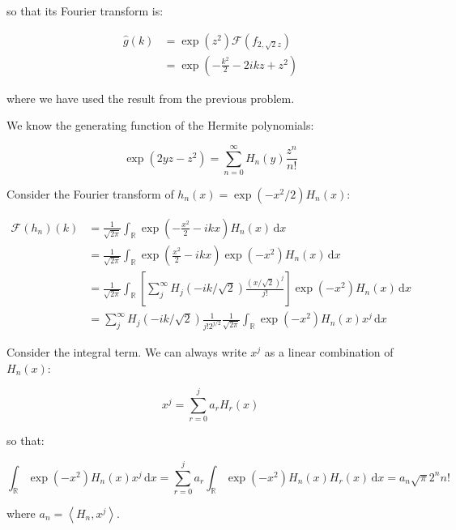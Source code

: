 \documentclass[12pt]{article}
\begin{document}
so that its Fourier transform is:

\begin{equation}
\begin{split}
    \hat{g}(k) &= \exp\left( z^{2} \right) \mathcal{F}(f_{2, \sqrt{2}z}) \\
    &= \exp\left( -\frac{k^{2}}{2} - 2ikz + z^{2} \right)
\end{split}
\end{equation}

where we have used the result from the previous problem.

We know the generating function of the Hermite polynomials:

\begin{equation}
    \exp(2yz - z^{2}) = \sum_{n = 0}^{\infty} H_{n}(y) \frac{z^{n}}{n!}
\end{equation}

Consider the Fourier transform of $h_{n}(x) = \exp(-x^{2}/2) H_{n}(x)$:

\begin{equation}
\begin{split}
    \mathcal{F}(h_{n})(k) &= \frac{1}{\sqrt{2\pi}} \int_{\mathbb{R}} \exp\left( -\frac{x^{2}}{2} -ikx \right) H_{n}(x) \, \mathrm{d}x \\
    &= \frac{1}{\sqrt{2\pi}} \int_{\mathbb{R}} \exp\left( \frac{x^{2}}{2} -ikx \right) \exp(-x^{2}) H_{n}(x) \, \mathrm{d}x \\
    &= \frac{1}{\sqrt{2\pi}} \int_{\mathbb{R}} \left[ \sum_{j}^{\infty} H_{j}(-ik/\sqrt{2}) \frac{(x/\sqrt{2})^{j}}{j!} \right] \exp(-x^{2}) H_{n}(x) \, \mathrm{d}x \\
    &= \sum_{j}^{\infty} H_{j}(-ik/\sqrt{2}) \frac{1}{j! 2^{j/2}} \frac{1}{\sqrt{2\pi}} \int_{\mathbb{R}} \exp(-x^{2}) H_{n}(x) x^{j} \, \mathrm{d}x
\end{split}
\end{equation}

Consider the integral term. We can always write $x^{j}$ as a linear combination of $H_{n}(x)$:

\begin{equation}
    x^{j} = \sum_{r = 0}^{j} a_{r} H_{r}(x)
\end{equation}

so that:

\begin{equation}
    \int_{\mathbb{R}} \exp(-x^{2}) H_{n}(x) x^{j} \, \mathrm{d}x = \sum_{r = 0}^{j} a_{r} \int_{\mathbb{R}} \exp(-x^{2}) H_{n}(x) H_{r}(x) \, \mathrm{d}x = a_{n} \sqrt{\pi} 2^{n} n!
\end{equation}

where $a_{n} = \left\langle H_{n}, x^{j} \right\rangle$.
\end{document}
